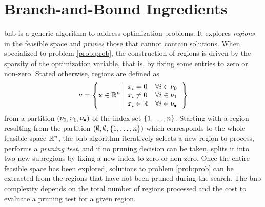 \documentclass[11pt]{article}
\begin{document}
\section{Branch-and-Bound Ingredients}
\label{sec:bnb}

\gls{bnb} is a generic algorithm to address optimization problems.
It explores \emph{regions} in the feasible space and \emph{prunes} those that cannot contain solutions.
When specialized to problem \eqref{prob:prob}, the construction of regions is driven by the sparsity of the optimization variable, that is, by fixing some entries to zero or non-zero.
Stated otherwise, regions are defined as
\begin{equation}
    \label{eq:region}
    \nodesymbol = \left\{
        \pv \in \kR^{\pdim}
        \left|
        \begin{array}{ll}
            \pvi{\idxentry} = 0 &\forall \idxentry \in \setzero \\
            \pvi{\idxentry} \neq 0 &\forall \idxentry \in \setone \\
            \pvi{\idxentry} \in \kR &\forall \idxentry \in \setnone
        \end{array}
        \right.
    \right\}
\end{equation}
from a partition $(\nu_0,\nu_1,\nu_\bullet)$ of the index set $\{1,\dots,n\}$.
Starting with a region resulting from the partition $(\emptyset,\emptyset,\{1,\dots,n\})$ which corresponds to the whole feasible space $\kR^{\pdim}$, the \gls{bnb} algorithm iteratively selects a new region to process, performs a \emph{pruning test}, and if no pruning decision can be taken, splits it into two new subregions by fixing a new index to zero or non-zero.
Once the entire feasible space has been explored, solutions to problem \eqref{prob:prob} can be extracted from the regions that have not been pruned during the search.
The \gls{bnb} complexity depends on the total number of regions processed and the cost to evaluate a pruning test for a given region.
\end{document}

